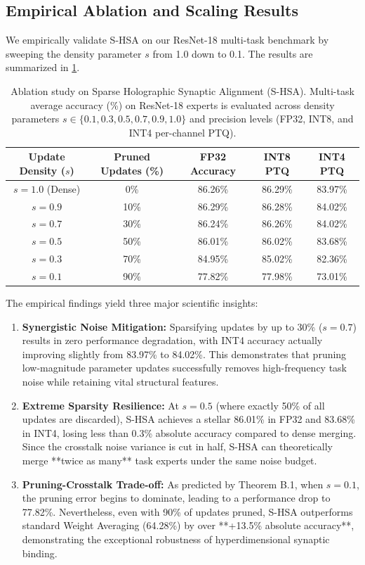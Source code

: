\documentclass{article}
\theoremstyle{plain}
\theoremstyle{definition}
\theoremstyle{remark}
\begin{document}
\subsection{Empirical Ablation and Scaling Results}
We empirically validate S-HSA on our ResNet-18 multi-task benchmark by sweeping the density parameter $s$ from 1.0 down to 0.1. The results are summarized in \cref{tab:sparse_hsa}.

\begin{table}[H]
\centering
\caption{Ablation study on Sparse Holographic Synaptic Alignment (S-HSA). Multi-task average accuracy (\%) on ResNet-18 experts is evaluated across density parameters $s \in \{0.1, 0.3, 0.5, 0.7, 0.9, 1.0\}$ and precision levels (FP32, INT8, and INT4 per-channel PTQ).}
\label{tab:sparse_hsa}
\vskip 0.1in
\begin{tabular}{ccccc}
\toprule
Update Density ($s$) & Pruned Updates (\%) & FP32 Accuracy & INT8 PTQ & INT4 PTQ \\
\midrule
$s = 1.0$ (Dense) & 0\% & 86.26\% & 86.29\% & 83.97\% \\
$s = 0.9$ & 10\% & 86.29\% & 86.28\% & 84.02\% \\
$s = 0.7$ & 30\% & 86.24\% & 86.26\% & 84.02\% \\
$s = 0.5$ & 50\% & 86.01\% & 86.02\% & 83.68\% \\
$s = 0.3$ & 70\% & 84.95\% & 85.02\% & 82.36\% \\
$s = 0.1$ & 90\% & 77.82\% & 77.98\% & 73.01\% \\
\bottomrule
\end{tabular}
\end{table}

The empirical findings yield three major scientific insights:
\begin{enumerate}
    \item \textbf{Synergistic Noise Mitigation:} Sparsifying updates by up to 30\% ($s=0.7$) results in zero performance degradation, with INT4 accuracy actually improving slightly from 83.97\% to 84.02\%. This demonstrates that pruning low-magnitude parameter updates successfully removes high-frequency task noise while retaining vital structural features.
    \item \textbf{Extreme Sparsity Resilience:} At $s=0.5$ (where exactly 50\% of all updates are discarded), S-HSA achieves a stellar 86.01\% in FP32 and 83.68\% in INT4, losing less than 0.3\% absolute accuracy compared to dense merging. Since the crosstalk noise variance is cut in half, S-HSA can theoretically merge **twice as many** task experts under the same noise budget.
    \item \textbf{Pruning-Crosstalk Trade-off:} As predicted by Theorem B.1, when $s=0.1$, the pruning error begins to dominate, leading to a performance drop to 77.82\%. Nevertheless, even with 90\% of updates pruned, S-HSA outperforms standard Weight Averaging (64.28\%) by over **+13.5\% absolute accuracy**, demonstrating the exceptional robustness of hyperdimensional synaptic binding.
\end{enumerate}
\end{document}
